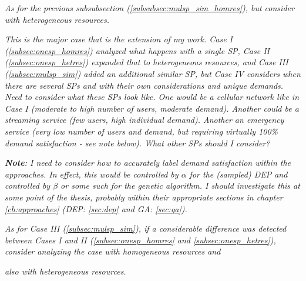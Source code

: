 \documentclass[12pt,dvipsnames]{report}
\begin{document}
\textit{As for the previous subsubsection (\ref{subsubsec:mulsp_sim_homres}), but consider with heterogeneous resources.}


\textit{This is the major case that is the extension of my work.  Case I (\ref{subsec:onesp_homres}) analyzed what happens with a single SP, Case II (\ref{subsec:onesp_hetres}) expanded that to heterogeneous resources, and Case III (\ref{subsec:mulsp_sim}) added an additional similar SP, but Case IV considers when there are several SPs and with their own considerations and unique demands.  Need to consider what these SPs look like.  One would be a cellular network like in Case I (moderate to high number of users, moderate demand).  Another could be a streaming service (few users, high individual demand).  Another an emergency service (very low number of users and demand, but requiring virtually 100\% demand satisfaction - see note below).  What other SPs should I consider?}

\textit{\textbf{Note}: I need to consider how to accurately label demand satisfaction within the approaches.  In effect, this would be controlled by $\alpha$ for the (sampled) DEP and controlled by $\beta$ or some such for the genetic algorithm.  I should investigate this at some point of the thesis, probably within their appropriate sections in chapter \ref{ch:approaches} (DEP: \ref{sec:dep} and GA: \ref{sec:ga}).}


\textit{As for Case III (\ref{subsec:mulsp_sim}), if a considerable difference was detected between Cases I and II (\ref{subsec:onesp_homres} and \ref{subsec:onesp_hetres}), consider analyzing the case with homogeneous resources and}


\textit{also with heterogeneous resources.}
\fi
\end{document}
